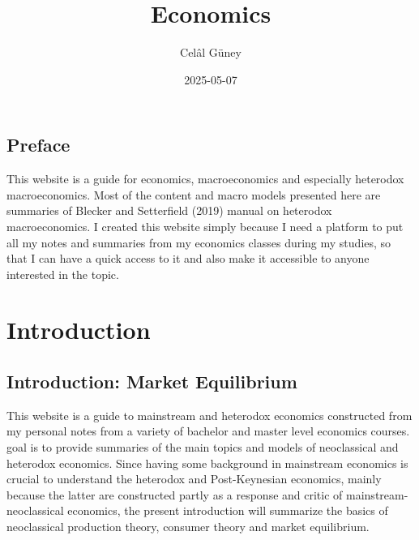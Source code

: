 \documentclass[
  letterpaper,
  DIV=11,
  numbers=noendperiod]{scrreprt}
\title{Economics}
\author{Celâl Güney}
\date{2025-05-07}
\renewcommand*\contentsname{Table of contents}
\newcommand\contentsname{Table of contents}
\begin{document}
\maketitle
\ifdefined\Shaded\renewenvironment{Shaded}{\begin{tcolorbox}[breakable, enhanced, borderline west={3pt}{0pt}{shadecolor}, boxrule=0pt, interior hidden, sharp corners, frame hidden]}{\end{tcolorbox}}\fi

\renewcommand*\contentsname{Table of contents}
{
\hypersetup{linkcolor=}
\setcounter{tocdepth}{2}
\tableofcontents
}

\hypertarget{preface}{%
\chapter*{Preface}\label{preface}}


This website is a guide for economics, macroeconomics and especially
heterodox macroeconomics. Most of the content and macro models presented
here are summaries of Blecker and Setterfield (2019) manual on heterodox
macroeconomics. I created this website simply because I need a platform
to put all my notes and summaries from my economics classes during my
studies, so that I can have a quick access to it and also make it
accessible to anyone interested in the topic.

\part{Introduction}

\hypertarget{introduction-market-equilibrium}{%
\chapter{Introduction: Market
Equilibrium}\label{introduction-market-equilibrium}}

This website is a guide to mainstream and heterodox economics
constructed from my personal notes from a variety of bachelor and master
level economics courses. goal is to provide summaries of the main topics
and models of neoclassical and heterodox economics. Since having some
background in mainstream economics is crucial to understand the
heterodox and Post-Keynesian economics, mainly because the latter are
constructed partly as a response and critic of mainstream-neoclassical
economics, the present introduction will summarize the basics of
neoclassical production theory, consumer theory and market equilibrium.
\end{document}

